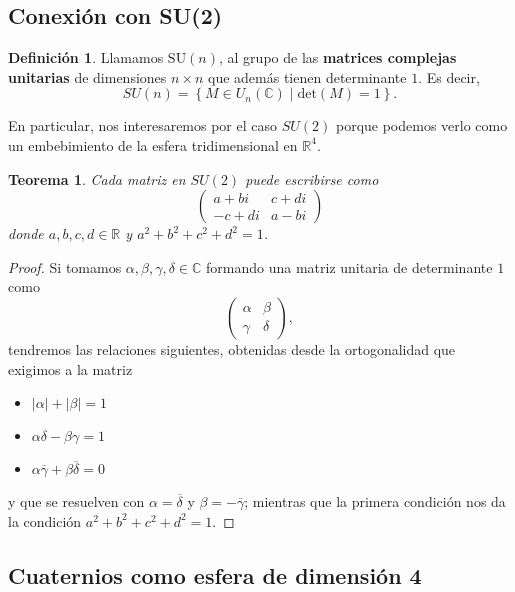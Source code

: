 \documentclass{article}
\theoremstyle{plain}
\newtheorem{theorem}{Teorema}
\theoremstyle{definition}
\newtheorem{definition}{Definición}
\theoremstyle{remark}
\begin{document}
\subsection{Conexión con SU(2)}
\cite{gelfand63}

\begin{definition}
  Llamamos $\mathrm{SU}(n)$, al grupo de las \textbf{matrices complejas unitarias} de dimensiones
  $n \times n$ que además tienen determinante $1$. Es decir,
  \[SU(n) = \left\{ M \in U_n(\mathbb{C}) \mid \mathrm{det}(M) = 1 \right\}.\]
\end{definition}

En particular, nos interesaremos por el caso $SU(2)$ porque podemos
verlo como un embebimiento de la esfera tridimensional en
$\mathbb{R}^4$.

\begin{theorem}
\label{su2}
  Cada matriz en $SU(2)$ puede escribirse como
  \[\begin{pmatrix}
      a+bi & c+di \\
      -c+di & a-bi
    \end{pmatrix}\]
  donde $a,b,c,d \in \mathbb{R}$ y $a^2+b^2+c^2+d^2 = 1$.
\end{theorem}
\begin{proof}
  Si tomamos $\alpha,\beta,\gamma,\delta \in \mathbb{C}$ formando una matriz unitaria de
  determinante $1$ como
    \[\begin{pmatrix}
      \alpha & \beta \\
      \gamma & \delta
    \end{pmatrix},\]
  tendremos las relaciones siguientes, obtenidas desde la ortogonalidad que exigimos a la matriz

  \begin{itemize}
    \item $|\alpha|+|\beta| = 1$
    \item $\alpha\delta-\beta\gamma = 1$
    \item $\alpha\overline{\gamma} + \beta\overline{\delta} = 0$
  \end{itemize}

  y que se resuelven con $\alpha = \overline{\delta}$ y
  $\beta = -\overline{\gamma}$; mientras que la primera condición
  nos da la condición $a^2+b^2+c^2+d^2 = 1$.
\end{proof}


\subsection{Cuaternios como esfera de dimensión 4}
\end{document}
